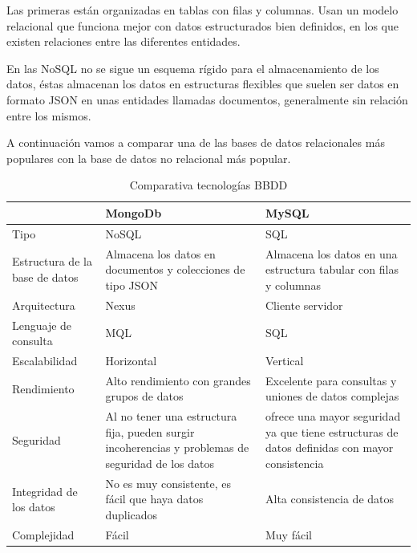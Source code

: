 Las primeras están organizadas en tablas con filas y columnas. Usan un modelo relacional que funciona mejor con datos estructurados bien definidos, en los que existen relaciones entre las diferentes entidades.

En las NoSQL no se sigue un esquema rígido para el almacenamiento de los datos, éstas almacenan los datos en estructuras flexibles que suelen ser datos en formato JSON en unas entidades llamadas documentos, generalmente sin relación entre los mismos.\cite{sqlvsno}

A continuación vamos a comparar una de las bases de datos relacionales más populares con la base de datos no relacional más popular. 

\begin{table}[H] %
    \centering
    \begin{tabular}{|p{2cm} |p{4 cm} |p{4cm} |} \hline 
         &  \textbf{MongoDb}&  \textbf{MySQL}\\  \hline 
         Tipo &  NoSQL &  SQL \\ \hline 
         
        Estructura de la base de datos &  Almacena los datos en documentos y colecciones de tipo JSON &  Almacena los datos en una estructura tabular con filas y columnas \\ \hline 
        Arquitectura &  Nexus &  Cliente servidor\\ \hline 
        Lenguaje de consulta &  MQL &  SQL\\ \hline
        Escalabilidad & Horizontal & Vertical \\ \hline
        Rendimiento & Alto rendimiento con grandes grupos de datos & Excelente para consultas y uniones de datos complejas \\ \hline 
        Seguridad &  Al no tener una estructura fija, pueden surgir incoherencias y problemas de seguridad de los datos &  ofrece una mayor seguridad ya que tiene estructuras de datos definidas con mayor consistencia \\ \hline
      	Integridad de los datos & No es muy consistente, es fácil que haya datos duplicados & Alta consistencia de datos \\ \hline
        Complejidad &  Fácil &  Muy fácil \\ \hline
        
    \end{tabular}
    \caption{Comparativa tecnologías BBDD \cite{sqlcomparison}}
    \label{tab:tec_db}
\end{table}


